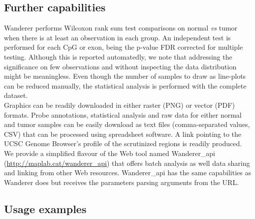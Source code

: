 \documentclass{bmcart}
\begin{document}
\subsection*{Further capabilities}

Wanderer performs Wilcoxon rank sum test comparisons on normal \textit{vs} tumor when there is at least an observation in each group. An independent test is performed for each CpG or exon, being the p-value FDR corrected for multiple testing. Although this is reported automatedly, we note that addressing the significance on few observations and without inspecting the data distribution might be meaningless. Even though the number of samples to draw as line-plots can be reduced manually, the statistical analysis is performed with the complete dataset.\\

Graphics can be readily downloaded in either raster (PNG) or vector (PDF) formats. Probe annotations, statistical analysis and raw data for either normal and tumor samples can be easily download as text files (comma-separated values, CSV) that can be processed using spreadsheet software. A link pointing to the UCSC Genome Browser's profile of the scrutinized regions is readily produced.\\

We provide a simplified flavour of the Web tool named Wanderer\_api (\url{http://maplab.cat/wanderer_api}) that offers batch analysis as well data sharing and linking from other Web resources. Wanderer\_api has the same capabilities as Wanderer does but receives the parameters parsing arguments from the URL. %




\subsection*{Usage examples}
 
\end{document}

